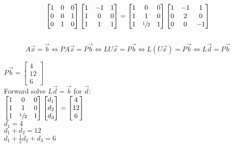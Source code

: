 \documentclass[12pt]{article}
\begin{document}
$$
    \begin{bmatrix}
        1 & 0 & 0 \\
        0 & 0 & 1 \\
        0 & 1 & 0 \\
    \end{bmatrix}
    \begin{bmatrix}
        1 & -1 & 1 \\
        1 & 0  & 0 \\
        1 & 1  & 1 \\
    \end{bmatrix}
    =
    \begin{bmatrix}
        1 & 0            & 0 \\
        1 & 1            & 0 \\
        1 & \sfrac{1}{2} & 1 \\
    \end{bmatrix}
    \begin{bmatrix}
        1 & -1 & 1  \\
        0 & 2  & 0  \\
        0 & 0  & -1 \\
    \end{bmatrix}
$$\\

$$
    A\vec{x} = \vec{b}
    \Longleftrightarrow PA\vec{x} = P\vec{b}
    \Longleftrightarrow LU\vec{x} = P\vec{b}
    \Longleftrightarrow L(U\vec{x}) = P\vec{b}
    \Longleftrightarrow L\vec{d} = P\vec{b}
$$

$
    P\vec{b} = \begin{bmatrix}
        4 \\12\\6
    \end{bmatrix}
$\\
Forward solve $L\vec{d} = \vec{b}$ for $\vec{d}$:\\
$
    \begin{bmatrix}
        1 & 0            & 0 \\
        1 & 1            & 0 \\
        1 & \sfrac{1}{2} & 1 \\
    \end{bmatrix}
    \begin{bmatrix}
        d_1 \\d_2\\d_3
    \end{bmatrix}
    =
    \begin{bmatrix}
        4 \\12\\6
    \end{bmatrix}
$\\
$d_1 = 4$\\
$d_1 + d_2 = 12$\\
$d_1 + \frac{1}{2}d_2 + d_3 = 6$\\
\end{document}
